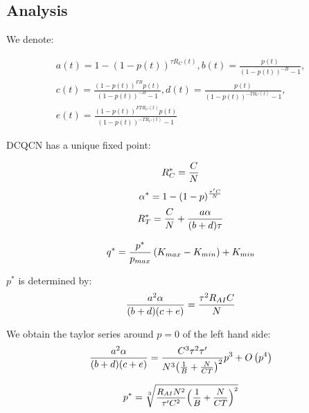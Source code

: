 \subsection{Analysis}

 We denote:

\begin{equation}
\begin{array}{l}
a(t) = 1 - {(1 - p(t))^{\tau {R_C}(t)}},b(t) = \frac{{p(t)}}{{{{(1 - p(t))}^{ - B}} - 1}},\\
c(t) = \frac{{{{(1 - p(t))}^{FB}}p(t)}}{{{{(1 - p(t))}^{ - B}} - 1}},d(t) = \frac{{p(t)}}{{{{(1 - p(t))}^{ - T{R_C}(t)}} - 1}},\\
e(t) = \frac{{{{(1 - p(t))}^{FT{R_C}(t)}}p(t)}}{{{{(1 - p(t))}^{ - T{R_C}(t)}} - 1}}
\end{array}
\end{equation}

DCQCN has a unique fixed point:

\begin{equation}
\small
{R_C^*} = \frac{C}{N}
\end{equation}
\begin{equation}
\small
\alpha^*  = 1 - {(1 - p)^{\frac{{\tau 'C}}{N}}}
\end{equation}
\begin{equation}
\small
{R_T^*} = \frac{C}{N} + \frac{{a\alpha }}{{(b + d)\tau }}
\end{equation}

\begin{equation}
\small
{q^*} = \frac{{{p^*}}}{{{p_{max}}}}\left( {{K_{max}} - {K_{min}}} \right) + {K_{min}}
\end{equation}

$p^*$ is determined by:
\begin{equation}
\small
\frac{{{a^2}\alpha }}{{(b + d)(c + e)}} = \frac{{{\tau ^2}{R_{AI}}C}}{N}
\end{equation}

We obtain the taylor series around $p=0$ of the left hand side:
\begin{equation}
\small
\frac{{{a^2}\alpha }}{{(b + d)(c + e)}} = \frac{{{C^3}{\tau ^2}\tau '}}{{{N^3}{{\left( {\frac{1}{B} + \frac{N}{{CT}}} \right)}^2}}}{p^3} + O\left( {{p^4}} \right)
\end{equation}

\begin{equation}
\small
{p^*} = \sqrt[3]{{\frac{{{R_{AI}}{N^2}}}{{\tau '{C^2}}}{{\left( {\frac{1}{B} + \frac{N}{{CT}}} \right)}^2}}}
\end{equation}

